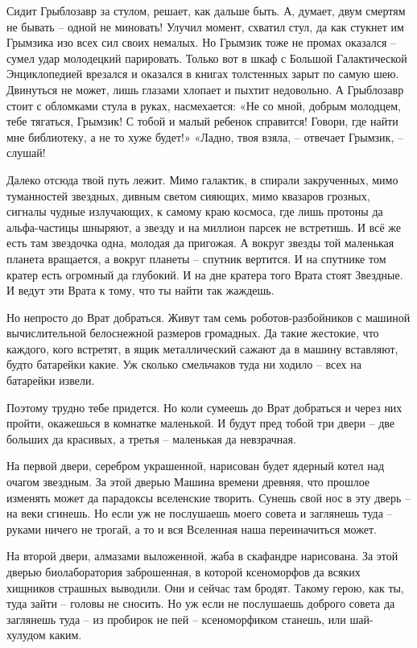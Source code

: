 \documentclass[ebook,oneside,final,openright]{memoir}
\begin{document}
Сидит Грыблозавр за стулом, решает, как дальше быть. А, думает, двум смертям не бывать – одной не миновать! Улучил момент, схватил стул, да как стукнет им Грымзика изо всех сил своих немалых. Но Грымзик тоже не промах оказался – сумел удар молодецкий парировать. Только вот в шкаф с Большой Галактической Энциклопедией врезался и оказался в книгах толстенных зарыт по самую шею. Двинуться не может, лишь глазами хлопает и пыхтит недовольно. А Грыблозавр стоит с обломками стула в руках, насмехается: «Не со мной, добрым молодцем, тебе тягаться, Грымзик! С тобой и малый ребенок справится! Говори, где найти мне библиотеку, а не то хуже будет!» «Ладно, твоя взяла, – отвечает Грымзик, – слушай!\par
\par
Далеко отсюда твой путь лежит. Мимо галактик, в спирали закрученных, мимо туманностей звездных, дивным светом сияющих, мимо квазаров грозных, сигналы чудные излучающих, к самому краю космоса, где лишь протоны да альфа-частицы шныряют, а звезду и на миллион парсек не встретишь. И всё же есть там звездочка одна, молодая да пригожая. А вокруг звезды той маленькая планета вращается, а вокруг планеты – спутник вертится. И на спутнике том кратер есть огромный да глубокий. И на дне кратера того Врата стоят Звездные. И ведут эти Врата к тому, что ты найти так жаждешь.\par
\par
Но непросто до Врат добраться. Живут там семь роботов-разбойников с машиной вычислительной белоснежной размеров громадных. Да такие жестокие, что каждого, кого встретят, в ящик металлический сажают да в машину вставляют, будто батарейки какие. Уж сколько смельчаков туда ни ходило – всех на батарейки извели.\par
\par
Поэтому трудно тебе придется. Но коли сумеешь до Врат добраться и через них пройти, окажешься в комнатке маленькой. И будут пред тобой три двери – две больших да красивых, а третья – маленькая да невзрачная.\par
\par
На первой двери, серебром украшенной, нарисован будет ядерный котел над очагом звездным. За этой дверью Машина времени древняя, что прошлое изменять может да парадоксы вселенские творить. Сунешь свой нос в эту дверь – на веки сгинешь. Но если уж не послушаешь моего совета и заглянешь туда – руками ничего не трогай, а то и вся Вселенная наша переиначиться может.\par
\par
На второй двери, алмазами выложенной, жаба в скафандре нарисована. За этой дверью биолаборатория заброшенная, в которой ксеноморфов да всяких хищников страшных выводили. Они и сейчас там бродят. Такому герою, как ты, туда зайти – головы не сносить. Но уж если не послушаешь доброго совета да заглянешь туда – из пробирок не пей – ксеноморфиком станешь, или шай-хулудом каким.\par
\end{document}
